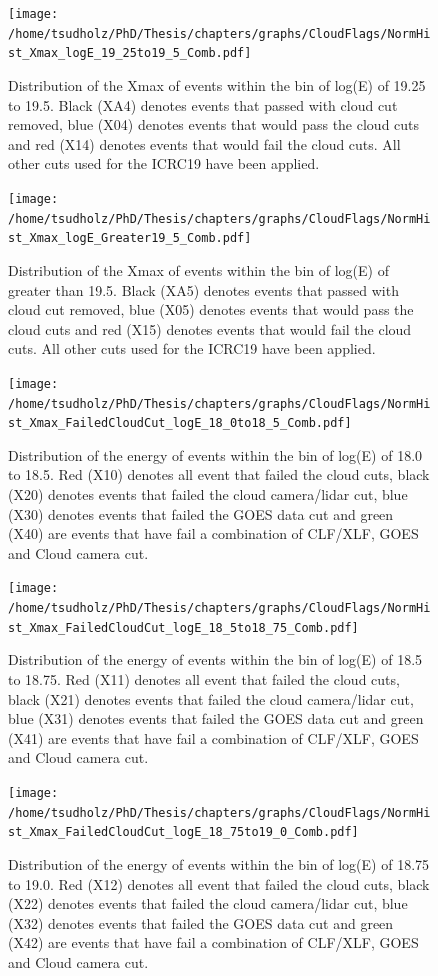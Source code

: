 \begin{figure}
\centering
\texttt{[image: /home/tsudholz/PhD/Thesis/chapters/graphs/CloudFlags/NormHist\_Xmax\_logE\_19\_25to19\_5\_Comb.pdf]}
\caption{Distribution of the Xmax of events within the bin of log(E) of 19.25 to 19.5. Black (XA4) denotes events that passed with cloud cut removed, blue (X04) denotes events that would pass the cloud cuts and red (X14) denotes events that would fail the cloud cuts. All other cuts used for the ICRC19 have been applied.}
\end{figure}

\begin{figure}
\centering
\texttt{[image: /home/tsudholz/PhD/Thesis/chapters/graphs/CloudFlags/NormHist\_Xmax\_logE\_Greater19\_5\_Comb.pdf]}
\caption{Distribution of the Xmax of events within the bin of log(E) of greater than 19.5. Black (XA5) denotes events that passed with cloud cut removed, blue (X05) denotes events that would pass the cloud cuts and red (X15) denotes events that would fail the cloud cuts. All other cuts used for the ICRC19 have been applied.}
\end{figure}


\begin{figure}
\centering
\texttt{[image: /home/tsudholz/PhD/Thesis/chapters/graphs/CloudFlags/NormHist\_Xmax\_FailedCloudCut\_logE\_18\_0to18\_5\_Comb.pdf]}
\caption{Distribution of the energy of events within the bin of log(E) of 18.0 to 18.5. Red (X10) denotes all event that failed the cloud cuts, black (X20) denotes events that failed the cloud camera/lidar cut, blue (X30) denotes events that failed the GOES data cut and green (X40) are events that have fail a combination of CLF/XLF, GOES and Cloud camera cut.}
\end{figure}

\begin{figure}
\centering
\texttt{[image: /home/tsudholz/PhD/Thesis/chapters/graphs/CloudFlags/NormHist\_Xmax\_FailedCloudCut\_logE\_18\_5to18\_75\_Comb.pdf]}
\caption{Distribution of the energy of events within the bin of log(E) of 18.5 to 18.75. Red (X11) denotes all event that failed the cloud cuts, black (X21) denotes events that failed the cloud camera/lidar cut, blue (X31) denotes events that failed the GOES data cut and green (X41) are events that have fail a combination of CLF/XLF, GOES and Cloud camera cut.}
\end{figure}

\begin{figure}
\centering
\texttt{[image: /home/tsudholz/PhD/Thesis/chapters/graphs/CloudFlags/NormHist\_Xmax\_FailedCloudCut\_logE\_18\_75to19\_0\_Comb.pdf]}
\caption{Distribution of the energy of events within the bin of log(E) of 18.75 to 19.0. Red (X12) denotes all event that failed the cloud cuts, black (X22) denotes events that failed the cloud camera/lidar cut, blue (X32) denotes events that failed the GOES data cut and green (X42) are events that have fail a combination of CLF/XLF, GOES and Cloud camera cut.}
\end{figure}


